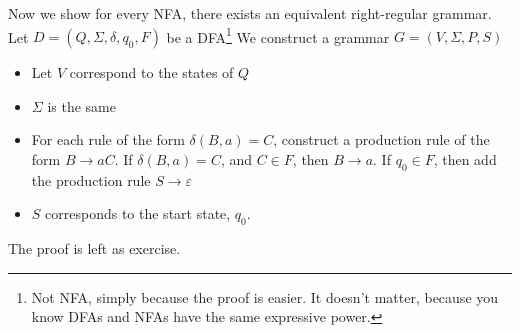 \documentclass[11pt]{article}
\begin{document}
Now we show for every NFA, there exists an equivalent right-regular grammar. Let $D = (Q, \Sigma, \delta, q_0, F)$ be a DFA\footnote{Not NFA, simply because the proof is easier. It doesn't matter, because you know DFAs and NFAs have the same expressive power. } We construct a grammar $G = (V, \Sigma, P , S)$
\begin{itemize}
    \item Let $V$ correspond to the states of $Q$
    \item $\Sigma$ is the same
    \item For each rule of the form $\delta(B,a) = C$, construct a production rule of the form $B \rightarrow aC$. If $\delta(B,a) = C$, and $C \in F$, then $B \rightarrow a$. If $q_0 \in F$, then add the production rule $S \rightarrow \varepsilon$
    \item $S$ corresponds to the start state, $q_0$. 
\end{itemize} The proof is left as exercise. 
\end{document}

